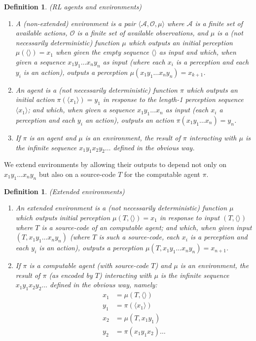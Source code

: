 \documentclass{article}
\newtheorem{mydefinition}[mytheorem]{Definition}
\def\A{\mathcal{A}}
\def\O{\mathcal{O}}
\begin{document}
\begin{mydefinition}
\label{agentenvironmentdefn}
(RL agents and environments)
  \begin{enumerate}
    \item
    A (non-extended) \emph{environment} is a
    pair $\langle \A,\O,\mu\rangle$ where $\A$ is a finite
    set of available \emph{actions}, $\O$ is a finite set of available
    \emph{observations}, and $\mu$ is a
    (not necessarily
    deterministic) function $\mu$ which outputs an initial
    perception $\mu(\langle\rangle)=x_1$ when given the empty sequence $\langle\rangle$
    as input
    and which, when given a sequence $x_1y_1\ldots x_ny_n$
    as input (where each $x_i$ is a perception and each
    $y_i$ is an action), outputs a perception
    $\mu(x_1y_1\ldots x_ny_n)=x_{k+1}$.
    \item
    An \emph{agent} is a (not necessarily deterministic)
    function $\pi$ which outputs an initial action $\pi(\langle x_1\rangle)=y_1$
    in response to the length-1 perception sequence $\langle x_1\rangle$;
    and which, when given a sequence $x_1y_1\ldots x_n$ as input
    (each $x_i$ a perception and each $y_i$ an action),
    outputs an action $\pi(x_1y_1\ldots x_n)=y_n$.
    \item
    If $\pi$ is an agent and $\mu$ is an environment, the \emph{result of
    $\pi$ interacting with $\mu$} is the infinite sequence
    $x_1y_1x_2y_2\ldots$ defined in the obvious way.
  \end{enumerate}
\end{mydefinition}

We extend environments by allowing their outputs to depend not only on
$x_1y_1\ldots x_ny_n$ but also on a source-code $T$ for the computable agent $\pi$.

\begin{mydefinition}
\label{extendedenvironmentsdefn}
(Extended environments)
\begin{enumerate}
  \item
  An \emph{extended environment} is a (not necessarily deterministic)
  function $\mu$ which outputs initial perception $\mu(T,\langle\rangle)=x_1$
  in response to input $(T,\langle\rangle)$ where $T$ is a source-code of an
  computable agent; and which, when given input $(T,x_1y_1\ldots x_ny_n)$ (where
  $T$ is such a source-code, each $x_i$ is a perception and each $y_i$ is
  an action), outputs a perception $\mu(T,x_1y_1\ldots x_ny_n)=x_{n+1}$.
  \item
  If $\pi$ is a computable agent (with source-code $T$)
  and $\mu$ is an environment, the \emph{result of $\pi$ (as encoded by $T$)
  interacting with $\mu$} is the infinite sequence $x_1y_1x_2y_2\ldots$ defined in
  the obvious way, namely:
  \begin{align*}
    x_1 &= \mu(T,\langle\rangle)\\
    y_1 &= \pi(\langle x_1\rangle)\\
    x_2 &= \mu(T,x_1y_1)\\
    y_2 &= \pi(x_1y_1x_2) \ldots
  \end{align*}
\end{enumerate}
\end{mydefinition}
\end{document}

